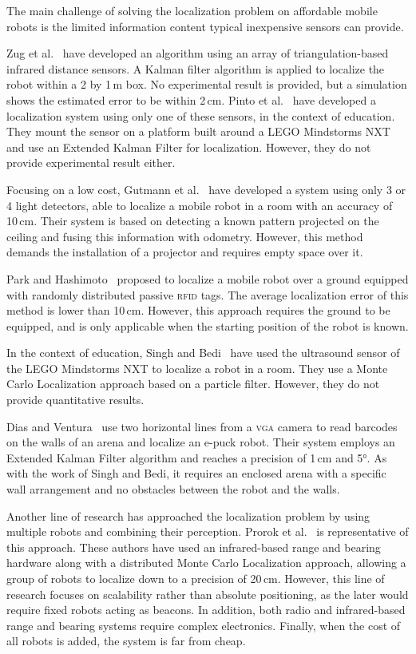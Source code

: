\documentclass[letterpaper, 10pt, conference]{ieeeconf}
\begin{document}
The main challenge of solving the localization problem on affordable mobile robots is the limited information content typical inexpensive sensors can provide.

Zug et al.~\cite{zug2011design} have developed an algorithm using an array of triangulation-based infrared distance sensors.
A Kalman filter algorithm is applied to localize the robot within a 2 by 1\,m box.
No experimental result is provided, but a simulation shows the estimated error to be within 2\,cm.
Pinto et al.~\cite{pinto2012localization} have developed a localization system using only one of these sensors, in the context of education.
They mount the sensor on a platform built around a LEGO Mindstorms NXT and use an Extended Kalman Filter for localization.
However, they do not provide experimental result either.

Focusing on a low cost, Gutmann et al.~\cite{gutmann2013challenges} have developed a system using only 3 or 4 light detectors, able to localize a mobile robot in a room with an accuracy of 10\,cm.
Their system is based on detecting a known pattern projected on the ceiling and fusing this information with odometry.
However, this method demands the installation of a projector and requires empty space over it.

Park and Hashimoto~\cite{park2009approach} proposed to localize a mobile robot over a ground equipped with randomly distributed passive \textsc{rfid} tags.
The average localization error of this method is lower than 10\,cm.
However, this approach requires the ground to be equipped, and is only applicable when the starting position of the robot is known.

In the context of education, Singh and Bedi~\cite{singh2013map} have used the ultrasound sensor of the LEGO Mindstorms NXT to localize a robot in a room.
They use a Monte Carlo Localization approach based on a particle filter.
However, they do not provide quantitative results.

Dias and Ventura~\cite{dias2013absolute} use two horizontal lines from a \textsc{vga} camera to read barcodes on the walls of an arena and localize an e-puck robot.
Their system employs an Extended Kalman Filter algorithm and reaches a precision of 1\,cm and 5°.
As with the work of Singh and Bedi, it requires an enclosed arena with a specific wall arrangement and no obstacles between the robot and the walls.

Another line of research has approached the localization problem by using multiple robots and combining their perception.
Prorok et al.~\cite{prorok2012low} is representative of this approach.
These authors have used an infrared-based range and bearing hardware along with a distributed Monte Carlo Localization approach, allowing a group of robots to localize down to a precision of 20\,cm.
However, this line of research focuses on scalability rather than absolute positioning, as the later would require fixed robots acting as beacons.
In addition, both radio and infrared-based range and bearing systems require complex electronics.
Finally, when the cost of all robots is added, the system is far from cheap.
\end{document}
